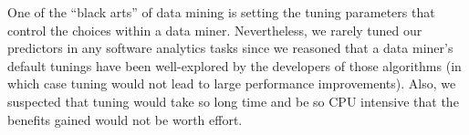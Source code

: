 


One of the ``black arts'' of data mining is setting the tuning
parameters that control the choices within a data miner. 
Nevertheless, we rarely tuned our predictors in
any software analytics tasks since we reasoned that a data miner's default tunings have been 
well-explored by the developers of those algorithms (in which case
tuning would not lead to large performance improvements). Also, we suspected that
tuning would take so long time and be so CPU intensive that the benefits gained would not be worth effort.

